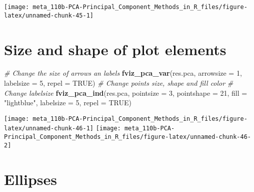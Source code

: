 \documentclass[]{book}
\newenvironment{Shaded}{\begin{snugshade}}{\end{snugshade}}
\newcommand{\CommentTok}[1]{\textcolor[rgb]{0.56,0.35,0.01}{\textit{#1}}}
\newcommand{\DataTypeTok}[1]{\textcolor[rgb]{0.13,0.29,0.53}{#1}}
\newcommand{\DecValTok}[1]{\textcolor[rgb]{0.00,0.00,0.81}{#1}}
\newcommand{\KeywordTok}[1]{\textcolor[rgb]{0.13,0.29,0.53}{\textbf{#1}}}
\newcommand{\NormalTok}[1]{#1}
\newcommand{\OtherTok}[1]{\textcolor[rgb]{0.56,0.35,0.01}{#1}}
\newcommand{\StringTok}[1]{\textcolor[rgb]{0.31,0.60,0.02}{#1}}
\begin{document}
\begin{center}\texttt{[image: meta\_110b-PCA-Principal\_Component\_Methods\_in\_R\_files/figure-latex/unnamed-chunk-45-1]} \end{center}

\hypertarget{size-and-shape-of-plot-elements}{%
\section{Size and shape of plot elements}\label{size-and-shape-of-plot-elements}}

\begin{Shaded}
\begin{Highlighting}[]
\CommentTok{# Change the size of arrows an labels}
\KeywordTok{fviz_pca_var}\NormalTok{(res.pca, }\DataTypeTok{arrowsize =} \DecValTok{1}\NormalTok{, }\DataTypeTok{labelsize =} \DecValTok{5}\NormalTok{, }
             \DataTypeTok{repel =} \OtherTok{TRUE}\NormalTok{)}
\CommentTok{# Change points size, shape and fill color}
\CommentTok{# Change labelsize}
\KeywordTok{fviz_pca_ind}\NormalTok{(res.pca, }
             \DataTypeTok{pointsize =} \DecValTok{3}\NormalTok{, }\DataTypeTok{pointshape =} \DecValTok{21}\NormalTok{, }\DataTypeTok{fill =} \StringTok{"lightblue"}\NormalTok{,}
             \DataTypeTok{labelsize =} \DecValTok{5}\NormalTok{, }\DataTypeTok{repel =} \OtherTok{TRUE}\NormalTok{)}
\end{Highlighting}
\end{Shaded}

\begin{center}\texttt{[image: meta\_110b-PCA-Principal\_Component\_Methods\_in\_R\_files/figure-latex/unnamed-chunk-46-1]} \texttt{[image: meta\_110b-PCA-Principal\_Component\_Methods\_in\_R\_files/figure-latex/unnamed-chunk-46-2]} \end{center}

\hypertarget{ellipses}{%
\section{Ellipses}\label{ellipses}}
\end{document}
